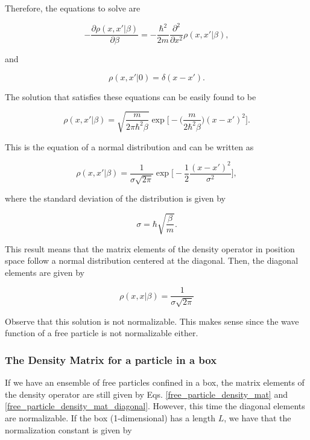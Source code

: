 \documentclass{article}
\begin{document}
Therefore, the equations to solve are

\begin{equation}
    - \frac{\partial \rho(x, x' | \beta)}{\partial \beta} = -\frac{\hbar^{2}}{2m} \frac{\partial^{2}}{\partial x^{2}} \rho(x, x' | \beta),
\end{equation}

and

\begin{equation}
    \rho(x, x' | 0) = \delta(x-x').
\end{equation}

The solution that satisfies these equations can be easily found to be

\begin{equation}
    \rho(x, x' | \beta) = \sqrt{\frac{m}{2\pi \hbar^{2} \beta}} \exp\bigg[-\bigg(\frac{m}{2 \hbar^{2} \beta}\bigg)(x-x')^{2}\bigg].
\end{equation}

This is the equation of a normal distribution and can be written as

\begin{equation}\label{density_matrix_free_particle}
    \rho(x, x' | \beta) = \frac{1}{\sigma \sqrt{2\pi}}\exp\bigg[-\frac{1}{2} \frac{(x-x')^{2}}{\sigma^{2}} \bigg],
\end{equation}

where the standard deviation of the distribution is given by

\begin{equation}\label{free_particle_density_mat}
    \sigma = \hbar \sqrt{\frac{\beta}{m}}.
\end{equation}

This result means that the matrix elements of the density operator in position space follow a normal distribution centered at the diagonal. Then, the diagonal elements are given by

\begin{equation}\label{free_particle_density_mat_diagonal}
    \rho(x, x | \beta) = \frac{1}{\sigma \sqrt{2\pi}}
\end{equation}

Observe that this solution is not normalizable. This makes sense since the wave function of a free particle is not normalizable either.

\subsubsection{The Density Matrix for a particle in a box}
If we have an ensemble of free particles confined in a box, the matrix elements of the density operator are still given by Eqs. \ref{free_particle_density_mat} and \ref{free_particle_density_mat_diagonal}. However, this time the diagonal elements are normalizable. If the box (1-dimensional) has a length $L$, we have that the normalization constant is given by
\end{document}

